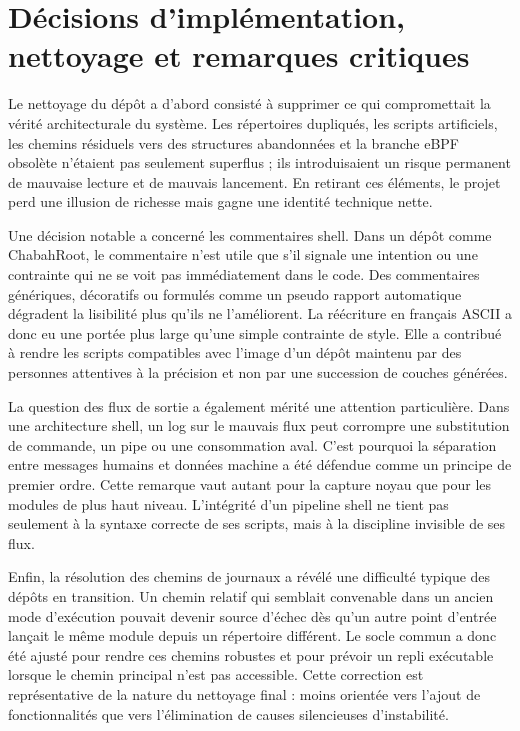 \documentclass[12pt,a4paper]{report}
\begin{document}
\chapter{Décisions d’implémentation, nettoyage et remarques critiques}
Le nettoyage du dépôt a d’abord consisté à supprimer ce qui compromettait la vérité architecturale du système. Les répertoires dupliqués, les scripts artificiels, les chemins résiduels vers des structures abandonnées et la branche eBPF obsolète n’étaient pas seulement superflus ; ils introduisaient un risque permanent de mauvaise lecture et de mauvais lancement. En retirant ces éléments, le projet perd une illusion de richesse mais gagne une identité technique nette.

Une décision notable a concerné les commentaires shell. Dans un dépôt comme ChabahRoot, le commentaire n’est utile que s’il signale une intention ou une contrainte qui ne se voit pas immédiatement dans le code. Des commentaires génériques, décoratifs ou formulés comme un pseudo rapport automatique dégradent la lisibilité plus qu’ils ne l’améliorent. La réécriture en français ASCII a donc eu une portée plus large qu’une simple contrainte de style. Elle a contribué à rendre les scripts compatibles avec l’image d’un dépôt maintenu par des personnes attentives à la précision et non par une succession de couches générées.

La question des flux de sortie a également mérité une attention particulière. Dans une architecture shell, un log sur le mauvais flux peut corrompre une substitution de commande, un pipe ou une consommation aval. C’est pourquoi la séparation entre messages humains et données machine a été défendue comme un principe de premier ordre. Cette remarque vaut autant pour la capture noyau que pour les modules de plus haut niveau. L’intégrité d’un pipeline shell ne tient pas seulement à la syntaxe correcte de ses scripts, mais à la discipline invisible de ses flux.

Enfin, la résolution des chemins de journaux a révélé une difficulté typique des dépôts en transition. Un chemin relatif qui semblait convenable dans un ancien mode d’exécution pouvait devenir source d’échec dès qu’un autre point d’entrée lançait le même module depuis un répertoire différent. Le socle commun a donc été ajusté pour rendre ces chemins robustes et pour prévoir un repli exécutable lorsque le chemin principal n’est pas accessible. Cette correction est représentative de la nature du nettoyage final : moins orientée vers l’ajout de fonctionnalités que vers l’élimination de causes silencieuses d’instabilité.
\end{document}
